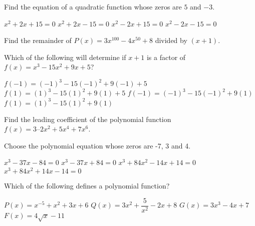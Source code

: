 \begin{questions}
\question Find the equation of a quadratic function whose zeros are $5$ and $-3$. 
\begin{multicols}{4}
\begin{choices}  
\choice $x^{2} + 2 x + 15=0$
\choice $x^{2} + 2 x - 15=0$
\choice $x^{2} - 2 x + 15=0$
\CorrectChoice $x^{2} - 2 x - 15=0$
\end{choices}
\end{multicols} 

\question Find the remainder of  $P(x) = 3x^{100} -4x^{50} + 8$  divided by $(x + 1)$.
\begin{multicols}{4}
\begin{choices}  
\end{choices}
\end{multicols} 

\question Which of the following will determine if  $x + 1$ is a factor of  $f(x) = x^3-15x^2 + 9x + 5$?
\begin{multicols}{2}
\begin{choices} 
\CorrectChoice $f(-1) = (-1)^3  -15(-1)^2 + 9(-1) + 5$   
\choice $f(1) = (1)^3-15(1)^2 + 9(1) + 5$
\choice $f(-1) = (-1)^3-15(-1)^2 + 9(1) $
\choice $f(1) = (1)^3-15(1)^2 + 9(1) $
\end{choices}
\end{multicols} 

\question Find the leading coefficient of the polynomial function \mbox{$f(x) = 3 – 2x^2 + 5x^4 + 7x^6$}.
\begin{multicols}{4}
\begin{choices}  
\end{choices}
\end{multicols} 

\question Choose the polynomial equation whose zeros are -7, 3 and 4.
\begin{multicols}{2}
\begin{choices}  
\choice $x^{3} - 37 x- 84=0$
\CorrectChoice $x^{3} - 37 x + 84=0$
\choice $x^3 + 84x^2 - 14x + 14 = 0$
\choice $x^3 + 84x^2 +14x - 14 = 0$
\end{choices}
\end{multicols} 

\question Which of the following defines a polynomial function?
\begin{multicols}{2}
\begin{choices}  
\choice $P(x) =x^{-5}+x^2+3x+6$
\choice $Q(x) =3x^2+\dfrac{5}{x^2}-2x+8 $
\CorrectChoice $G(x) =3x^3-4x+7$
\choice $F(x) =4\sqrt{x}-11$
\end{choices}
\end{multicols} 


\end{questions}
